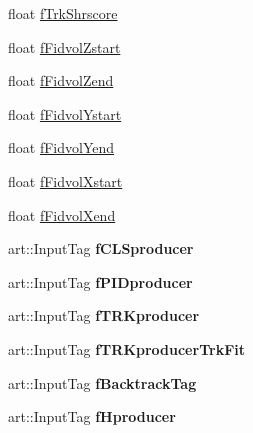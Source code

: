 \begin{DoxyCompactItemize}
\item 
float \hyperlink{classselection_1_1NuMuSelection_ad112dbbc5a443a1ff5408c512788a154}{f\-Trk\-Shrscore}
\item 
float \hyperlink{classselection_1_1NuMuSelection_afd0602fc9b69392ffb8dbc36c6ff3e61}{f\-Fidvol\-Zstart}
\item 
float \hyperlink{classselection_1_1NuMuSelection_adae665ca6cf1ece4b7e00b345cebbfe3}{f\-Fidvol\-Zend}
\item 
float \hyperlink{classselection_1_1NuMuSelection_a68277003f5211d751a5965dc990ff661}{f\-Fidvol\-Ystart}
\item 
float \hyperlink{classselection_1_1NuMuSelection_ac07847d191d7d4db8267d89e0caab414}{f\-Fidvol\-Yend}
\item 
float \hyperlink{classselection_1_1NuMuSelection_a5f015a245b7a149756f787f2dab9fcc7}{f\-Fidvol\-Xstart}
\item 
float \hyperlink{classselection_1_1NuMuSelection_ab57daae1ee3ed13b58016eb68f0d6712}{f\-Fidvol\-Xend}
\item 
\hypertarget{classselection_1_1NuMuSelection_a2b42e74d57763e5b49f6fd1123bdb154}{art\-::\-Input\-Tag {\bfseries f\-C\-L\-Sproducer}}\label{classselection_1_1NuMuSelection_a2b42e74d57763e5b49f6fd1123bdb154}

\item 
\hypertarget{classselection_1_1NuMuSelection_a54685a2abfa66dbf5a08cc58e215c013}{art\-::\-Input\-Tag {\bfseries f\-P\-I\-Dproducer}}\label{classselection_1_1NuMuSelection_a54685a2abfa66dbf5a08cc58e215c013}

\item 
\hypertarget{classselection_1_1NuMuSelection_aa458d765d2088552375177afa2006b08}{art\-::\-Input\-Tag {\bfseries f\-T\-R\-Kproducer}}\label{classselection_1_1NuMuSelection_aa458d765d2088552375177afa2006b08}

\item 
\hypertarget{classselection_1_1NuMuSelection_af12bf233739d67542d69294088a68336}{art\-::\-Input\-Tag {\bfseries f\-T\-R\-Kproducer\-Trk\-Fit}}\label{classselection_1_1NuMuSelection_af12bf233739d67542d69294088a68336}

\item 
\hypertarget{classselection_1_1NuMuSelection_a05394c48def95fa5e6334d48e278fe07}{art\-::\-Input\-Tag {\bfseries f\-Backtrack\-Tag}}\label{classselection_1_1NuMuSelection_a05394c48def95fa5e6334d48e278fe07}

\item 
\hypertarget{classselection_1_1NuMuSelection_a727573fc11e39692e79d8436b04c3ba9}{art\-::\-Input\-Tag {\bfseries f\-Hproducer}}\label{classselection_1_1NuMuSelection_a727573fc11e39692e79d8436b04c3ba9}


\end{DoxyCompactItemize}

